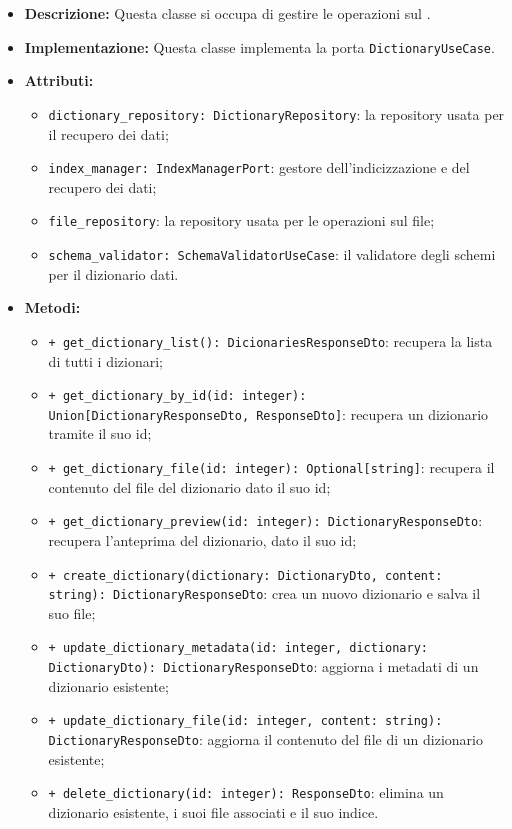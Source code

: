 \begin{itemize}
    \item \textbf{Descrizione:} Questa classe si occupa di gestire le operazioni sul . 
    \item \textbf{Implementazione:} Questa classe implementa la porta \texttt{DictionaryUseCase}. 
    \item \textbf{Attributi:}
    \begin{itemize}
        \item \texttt{dictionary\_repository: DictionaryRepository}: la repository usata per il recupero dei dati;
        \item \texttt{index\_manager: IndexManagerPort}: gestore dell'indicizzazione e del recupero dei dati;
        \item \texttt{file\_repository}: la repository usata per le operazioni sul file;
        \item \texttt{schema\_validator: SchemaValidatorUseCase}: il validatore degli schemi per il dizionario dati.
    \end{itemize}
    \item \textbf{Metodi:}
    \begin{itemize}
        \item \texttt{+ get\_dictionary\_list(): DicionariesResponseDto}: recupera la lista di tutti i dizionari;
        \item \texttt{+ get\_dictionary\_by\_id(id: integer): Union[DictionaryResponseDto, ResponseDto]}: recupera un dizionario tramite il suo id;
        \item \texttt{+ get\_dictionary\_file(id: integer): Optional[string]}: recupera il contenuto del file del dizionario dato il suo id;
        \item \texttt{+ get\_dictionary\_preview(id: integer): DictionaryResponseDto}: recupera l'anteprima del dizionario, dato il suo id;
        \item \texttt{+ create\_dictionary(dictionary: DictionaryDto, content: string): DictionaryResponseDto}: crea un nuovo dizionario e salva il suo file;
        \item \texttt{+ update\_dictionary\_metadata(id: integer, dictionary: DictionaryDto): DictionaryResponseDto}: aggiorna i metadati di un dizionario esistente;
        \item \texttt{+ update\_dictionary\_file(id: integer, content: string): DictionaryResponseDto}: aggiorna il contenuto del file di un dizionario esistente;
        \item \texttt{+ delete\_dictionary(id: integer): ResponseDto}: elimina un dizionario esistente, i suoi file associati e il suo indice.

\end{itemize}
\end{itemize}
